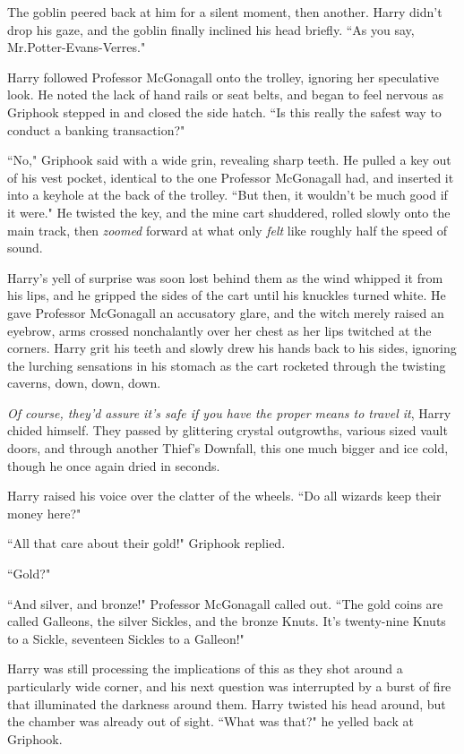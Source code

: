 The goblin peered back at him for a silent moment, then another. Harry didn't drop his gaze, and the goblin finally inclined his head briefly. ``As you say, Mr.\?Potter-Evans-Verres."

Harry followed Professor McGonagall onto the trolley, ignoring her speculative look. He noted the lack of hand rails or seat belts, and began to feel nervous as Griphook stepped in and closed the side hatch. ``Is this really the safest way to conduct a banking transaction?"

``No," Griphook said with a wide grin, revealing sharp teeth. He pulled a key out of his vest pocket, identical to the one Professor McGonagall had, and inserted it into a keyhole at the back of the trolley. ``But then, it wouldn't be much good if it were." He twisted the key, and the mine cart shuddered, rolled slowly onto the main track, then \emph{zoomed} forward at what only \emph{felt} like roughly half the speed of sound.

Harry's yell of surprise was soon lost behind them as the wind whipped it from his lips, and he gripped the sides of the cart until his knuckles turned white. He gave Professor McGonagall an accusatory glare, and the witch merely raised an eyebrow, arms crossed nonchalantly over her chest as her lips twitched at the corners. Harry grit his teeth and slowly drew his hands back to his sides, ignoring the lurching sensations in his stomach as the cart rocketed through the twisting caverns, down, down, down.

\emph{Of course, they'd assure it's safe if you have the proper means to travel it}, Harry chided himself. They passed by glittering crystal outgrowths, various sized vault doors, and through another Thief's Downfall, this one much bigger and ice cold, though he once again dried in seconds.

Harry raised his voice over the clatter of the wheels. ``Do all wizards keep their money here?"

``All that care about their gold!" Griphook replied.

``Gold?"

``And silver, and bronze!" Professor McGonagall called out. ``The gold coins are called Galleons, the silver Sickles, and the bronze Knuts. It's twenty-nine Knuts to a Sickle, seventeen Sickles to a Galleon!"

Harry was still processing the implications of this as they shot around a particularly wide corner, and his next question was interrupted by a burst of fire that illuminated the darkness around them. Harry twisted his head around, but the chamber was already out of sight. ``What was that?" he yelled back at Griphook.

